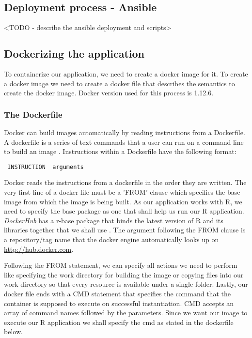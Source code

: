 \documentclass[9pt,twocolumn,twoside]{../../styles/osajnl}
\begin{document}
\subsection{Deployment process - Ansible}
<TODO - describe the ansible deployment and scripts>

\subsection{Dockerizing the application}
To containerize our application, we need to create a docker image for
it. To create a docker image we need to create a docker file that
describes the semantics to create the docker image. Docker version
used for this process is 1.12.6.

\subsubsection{The Dockerfile}
Docker can build images automatically by reading instructions from a
Dockerfile. A dockerfile is a series of text commands that a user can
run on a command line to build an image \cite{www-dockerfile-documentation}.
\newline
Instructions within a Dockerfile have the following format:

\begin{verbatim}
 INSTRUCTION  arguments
\end{verbatim}

Docker reads the instructions from a dockerfile in the order they are
written. The very first line of a docker file must be a 'FROM' clause
which specifies the base image from which the image is being built. As
our application works with R, we need to specify the base package as
one that shall help us run our R application. \emph{DockerHub} has a
r-base package that binds the latest version of R and its libraries
together that we shall use \cite{www-rbase-docker}.  The argument
following the FROM clause is a repository/tag name that the docker
engine automatically looks up on \url{http://hub.docker.com}.

Following the FROM statement, we can specify all actions we need to
perform like specifying the work directory for building the image or
copying files into our work directory so that every resource is
available under a single folder. Lastly, our docker file ends with a
CMD statement that specifies the command that the container is
supposed to execute on successful instantiation. CMD accepts an array
of command names followed by the parameters. Since we want our image
to execute our R application we shall specify the cmd as stated in the
dockerfile below.
\end{document}
